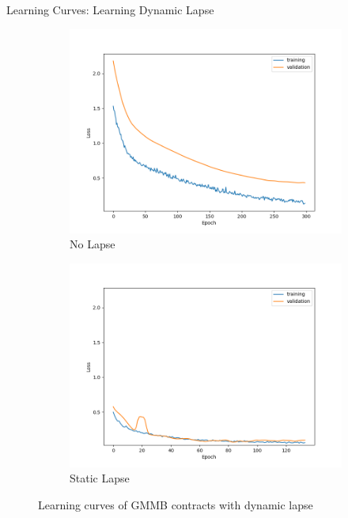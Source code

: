 \documentclass[9pt,handout]{beamer}
\begin{document}
\begin{frame}{Learning Curves: Learning Dynamic Lapse}

    \begin{figure}[ht]
        \centering
        \begin{subfigure}{0.48\textwidth}
            \includegraphics[width=\textwidth]{../project3/figures/figure2a.png}
            \caption{No Lapse}
        \end{subfigure}
        \begin{subfigure}{0.48\textwidth}
            \includegraphics[width=\textwidth]{../project3/figures/figure2b.png}
            \caption{Static Lapse}
        \end{subfigure}
        \caption{Learning curves of GMMB contracts with dynamic lapse}
    \end{figure}
    
\end{frame}
    
\end{document}
